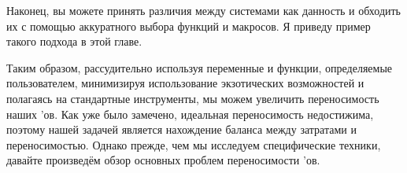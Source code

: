 Наконец, вы можете принять различия между системами как данность и
обходить их с помощью аккуратного выбора функций и макросов. Я приведу
пример такого подхода в этой главе.

Таким образом, рассудительно используя переменные и функции,
определяемые пользователем, минимизируя использование экзотических
возможностей и полагаясь на стандартные инструменты, мы можем
увеличить переносимость наших \Makefile{}'ов. Как уже было замечено,
идеальная переносимость недостижима, поэтому нашей задачей является
нахождение баланса между затратами и переносимостью. Однако прежде,
чем мы исследуем специфические техники, давайте произведём обзор
основных проблем переносимости \Makefile{}'ов.






